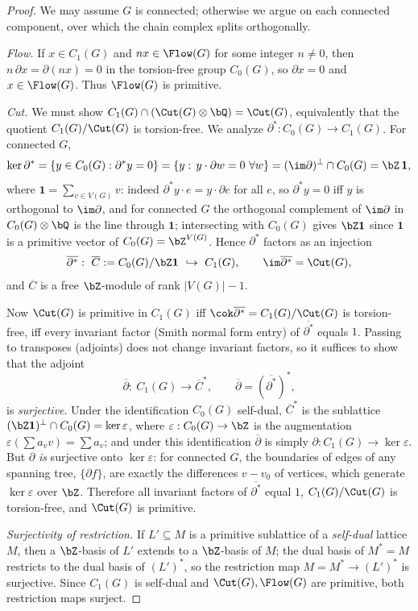 \begin{proof}
We may assume $G$ is connected; otherwise we argue on each connected component, over which
the chain complex splits orthogonally.

\emph{Flow.}  If $x\in C_1(G)$ and $nx\in\Flow(G)$ for some integer $n\ne 0$, then
$n\,\partial x=\partial(nx)=0$ in the torsion-free group $C_0(G)$, so $\partial x=0$ and
$x\in\Flow(G)$.  Thus $\Flow(G)$ is primitive.

\emph{Cut.}  We must show $C_1(G)\cap(\Cut(G)\otimes\bQ)=\Cut(G)$, equivalently that the
quotient $C_1(G)/\Cut(G)$ is torsion-free.  We analyze $\partial^\ast:C_0(G)\to C_1(G)$.
For connected $G$,
\[
\ker\partial^\ast=\{y\in C_0(G):\partial^\ast y=0\}
=\{y:\,y\cdot\partial w=0\ \forall w\}=(\im\partial)^\perp\cap C_0(G)=\bZ\,\mathbf 1,
\]
where $\mathbf 1=\sum_{v\in V(G)}v$: indeed $\partial^\ast y\cdot e=y\cdot\partial e$ for all
$e$, so $\partial^\ast y=0$ iff $y$ is orthogonal to $\im\partial$, and for connected $G$ the
orthogonal complement of $\im\partial$ in $C_0(G)\otimes\bQ$ is the line through $\mathbf 1$;
intersecting with $C_0(G)$ gives $\bZ\mathbf 1$ since $\mathbf 1$ is a primitive vector of
$C_0(G)=\bZ^{V(G)}$.  Hence $\partial^\ast$ factors as an injection
\[
\overline{\partial^\ast}:\ \overline C:=C_0(G)/\bZ\mathbf 1\ \hookrightarrow\ C_1(G),
\qquad \im\overline{\partial^\ast}=\Cut(G),
\]
and $\overline C$ is a free $\bZ$-module of rank $|V(G)|-1$.

Now $\Cut(G)$ is primitive in $C_1(G)$ iff $\cok\overline{\partial^\ast}=C_1(G)/\Cut(G)$ is
torsion-free, iff every invariant factor (Smith normal form entry) of $\overline{\partial^\ast}$
equals $1$.  Passing to transposes (adjoints) does not change invariant factors, so it
suffices to show that the adjoint
\[
\overline\partial:\ C_1(G)\longrightarrow \overline C^\ast,
\qquad \overline\partial=(\overline{\partial^\ast})^\ast,
\]
is \emph{surjective}.  Under the identification $C_0(G)$ self-dual, $\overline C^\ast$ is the
sublattice $(\bZ\mathbf 1)^\perp\cap C_0(G)=\ker\varepsilon$, where
$\varepsilon:C_0(G)\to\bZ$ is the augmentation $\varepsilon(\sum a_v v)=\sum a_v$; and under
this identification $\overline\partial$ is simply $\partial:C_1(G)\to\ker\varepsilon$.  But
$\partial$ \emph{is} surjective onto $\ker\varepsilon$: for connected $G$, the boundaries of
edges of any spanning tree, $\{\partial f\}$, are exactly the differences $v-v_0$ of
vertices, which generate $\ker\varepsilon$ over $\bZ$.  Therefore all invariant factors of
$\overline{\partial^\ast}$ equal $1$, $C_1(G)/\Cut(G)$ is torsion-free, and $\Cut(G)$ is
primitive.

\emph{Surjectivity of restriction.}  If $L'\subseteq M$ is a primitive sublattice of a
\emph{self-dual} lattice $M$, then a $\bZ$-basis of $L'$ extends to a $\bZ$-basis of $M$; the
dual basis of $M^\ast=M$ restricts to the dual basis of $(L')^\ast$, so the restriction map
$M=M^\ast\to(L')^\ast$ is surjective.  Since $C_1(G)$ is self-dual and $\Cut(G),\Flow(G)$ are
primitive, both restriction maps surject.
\end{proof}

